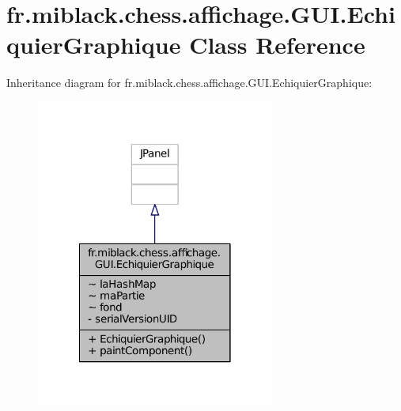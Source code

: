 \section{fr.\-miblack.\-chess.\-affichage.\-G\-U\-I.\-Echiquier\-Graphique Class Reference}
\label{classfr_1_1miblack_1_1chess_1_1affichage_1_1GUI_1_1EchiquierGraphique}


Inheritance diagram for fr.\-miblack.\-chess.\-affichage.\-G\-U\-I.\-Echiquier\-Graphique\-:
\nopagebreak
\begin{figure}[H]
\begin{center}
\leavevmode
\includegraphics[width=222pt]{classfr_1_1miblack_1_1chess_1_1affichage_1_1GUI_1_1EchiquierGraphique__inherit__graph}
\end{center}
\end{figure}


